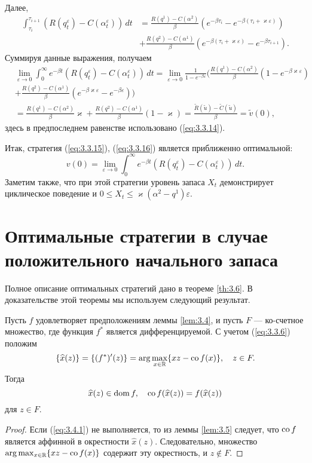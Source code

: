 Далее,
\begin{align*}
 \int_{\tau_i}^{\tau_{i+1}}(R(q_t^\varepsilon)-C(\alpha_t^\varepsilon))\,dt &=\frac{R(q^1)-C(\alpha^2)}{\beta} \left(e^{-\beta\tau_i}-e^{-\beta(\tau_i+\varkappa\varepsilon)}\right)\\
 &+\frac{R(q^2)-C(\alpha^1)}{\beta} \left(e^{-\beta(\tau_i+\varkappa\varepsilon)}-e^{-\beta\tau_{i+1}}\right).
\end{align*}
Суммируя данные выражения, получаем
\begin{align*}
 &\lim_{\varepsilon\to 0}\int_0^\infty e^{-\beta t} (R(q_t^\varepsilon)-C(\alpha_t^\varepsilon))\,dt =\lim_{\varepsilon\to 0}\frac{1}{1-e^{-\beta\varepsilon}}  \biggl( \frac{R(q^1)-C(\alpha^2)}{\beta} \left(1-e^{-\beta\varkappa\varepsilon}\right)\nonumber\\
 &+\frac{R(q^2)-C(\alpha^1)}{\beta} \left(e^{-\beta\varkappa\varepsilon}-e^{-\beta\varepsilon}\right)\biggr)\nonumber\\
 &=\frac{R(q^1)-C(\alpha^2)}{\beta}\varkappa+\frac{R(q^2)-C(\alpha^1)}{\beta}(1-\varkappa)=\frac{\widetilde R(\widetilde u)-\widetilde C(\widetilde u)}{\beta}=\widetilde v(0),
\end{align*}
здесь в предпоследнем равенстве использовано (\ref{eq:3.3.14}).

Итак, стратегия (\ref{eq:3.3.15}), (\ref{eq:3.3.16}) является приближенно оптимальной:
$$ v(0)=\lim_{\varepsilon\to 0}\int_0^\infty e^{-\beta t}(R(q_t^\varepsilon)-C(\alpha_t^\varepsilon))\,dt. $$
Заметим также, что при этой стратегии уровень запаса $X_t$  демонстрирует циклическое поведение и $0\le X_t\le\varkappa(\alpha^2-q^1)\varepsilon$.

\section{Оптимальные стратегии в случае положительного начального запаса} \label{sec:3.4}
Полное описание оптимальных стратегий дано в теореме \ref{th:3.6}. В доказательстве этой теоремы мы используем следующий результат.
\begin{lemma} \label{lem:3.6}
Пусть $f$ удовлетворяет предположениям леммы \ref{lem:3.4}, и пусть $F$ --- ко-счетное множество, где функция $f^*$ является дифференцируемой.  С учетом (\ref{eq:3.3.6}) положим
$$ \{\widehat x(z)\}=\{(f^*)'(z)\}=\arg\max_{x\in\mathbb R}\{xz-{\rm co\,} f(x)\},\quad z\in F.$$
Тогда
\begin{equation} \label{eq:3.4.1}
\widehat x(z)\in{\rm dom\,} f,\quad {\rm co\,} f(\widehat x(z))=f(\widehat x(z))
\end{equation}
для $z\in F$.
\end{lemma}
\begin{proof}
Если (\ref{eq:3.4.1}) не выполняется, то из леммы \ref{lem:3.5} следует, что ${\rm co\,} f$ является аффинной в окрестности $\widehat x(z)$. Следовательно, множество $\arg\max_{x\in\mathbb R}\{xz-{\rm co\,} f(x)\}$ содержит эту окрестность, и $z\not\in F$.
\end{proof}

